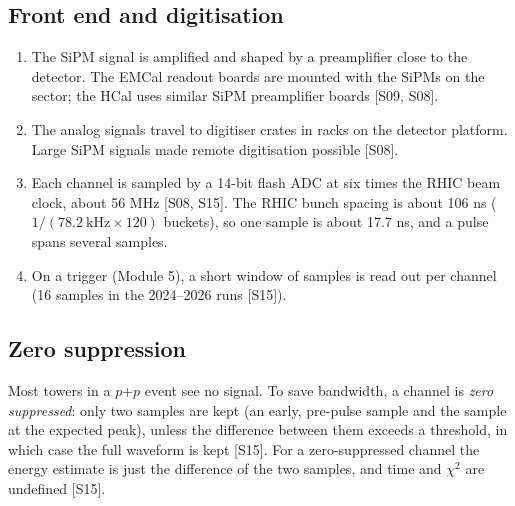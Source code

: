 \documentclass[11pt,letterpaper]{article}
\begin{document}
\subsection{Front end and digitisation}
\begin{enumerate}
\item The SiPM signal is amplified and shaped by a preamplifier close to the detector. The EMCal readout boards are mounted with the SiPMs on the sector; the HCal uses similar SiPM preamplifier boards [S09, S08].
\item The analog signals travel to digitiser crates in racks on the detector platform. Large SiPM signals made remote digitisation possible [S08].
\item Each channel is sampled by a 14-bit flash ADC at six times the RHIC beam clock, about 56 MHz [S08, S15]. The RHIC bunch spacing is about 106 ns ($1/(78.2\ \mathrm{kHz}\times120)$ buckets), so one sample is about 17.7 ns, and a pulse spans several samples.
\item On a trigger (Module 5), a short window of samples is read out per channel (16 samples in the 2024--2026 runs [S15]).
\end{enumerate}

\subsection{Zero suppression}
Most towers in a $p$+$p$ event see no signal.
To save bandwidth, a channel is \emph{zero suppressed}: only two samples are kept (an early, pre-pulse sample and the sample at the expected peak), unless the difference between them exceeds a threshold, in which case the full waveform is kept [S15].
For a zero-suppressed channel the energy estimate is just the difference of the two samples, and time and $\chi^2$ are undefined [S15].
\end{document}
